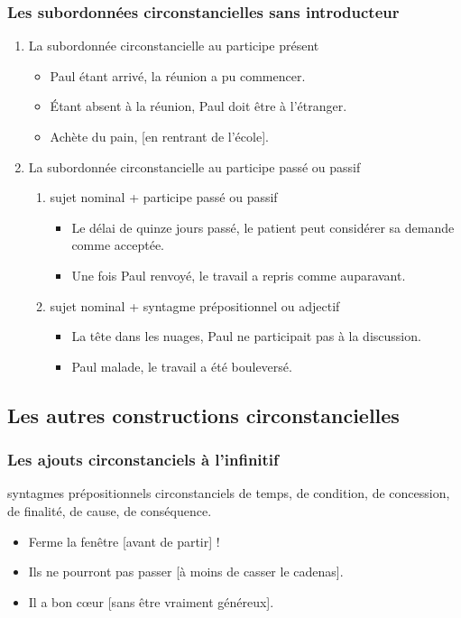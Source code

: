 \documentclass[UTF8]{report}
\begin{document}
\subsubsection{Les subordonnées circonstancielles sans introducteur}
\begin{enumerate}
    \item La subordonnée circonstancielle au participe présent
    \begin{itemize}
        \item Paul étant arrivé, la réunion a pu commencer.
        \item Étant absent à la réunion, Paul doit être à l’étranger.
        \item Achète du pain, [en rentrant de l’école].
    \end{itemize}
    \item La subordonnée circonstancielle au participe passé ou passif
    \begin{enumerate}
        \item sujet nominal + participe passé ou passif
        \begin{itemize}
            \item Le délai de quinze jours passé, le patient peut considérer sa demande comme acceptée.
            \item Une fois Paul renvoyé, le travail a repris comme auparavant.
        \end{itemize}
        \item sujet nominal + syntagme prépositionnel ou adjectif
        \begin{itemize}
            \item La tête dans les nuages, Paul ne participait pas à la discussion.
            \item Paul malade, le travail a été bouleversé.
        \end{itemize}
    \end{enumerate}
\end{enumerate}

\subsection{Les autres constructions circonstancielles}

\subsubsection{Les ajouts circonstanciels à l’infinitif}
syntagmes prépositionnels circonstanciels de temps, de condition, de concession, de finalité, de cause, de conséquence.
\begin{itemize}
    \item Ferme la fenêtre [avant de partir] !
    \item Ils ne pourront pas passer [à moins de casser le cadenas].
    \item Il a bon cœur [sans être vraiment généreux].
\end{itemize}
\end{document}
